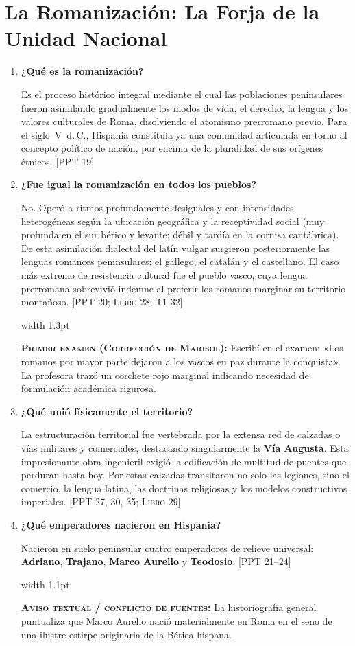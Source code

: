 \documentclass[11pt,letterpaper]{article}
\newcommand{\fuente}[1]{\nolinebreak\hfill{\footnotesize\color{black!55}\textsc{[#1]}}}
\newcommand{\examen}[1]{%
  \par\vspace{0.35em}%
  \noindent\hspace*{0.8em}%
  {\color{goodingCrimson}\vrule width 1.3pt}\hspace{0.7em}%
  \parbox{\dimexpr\linewidth-2.2em}{%
    \footnotesize\color{goodingCrimson}%
    \textbf{\textsc{Primer examen (Corrección de Marisol):}} #1%
  }%
  \par\vspace{0.35em}%
}
\newcommand{\aviso}[1]{%
  \par\vspace{0.3em}%
  \noindent\hspace*{0.8em}%
  {\color{black!40}\vrule width 1.1pt}\hspace{0.7em}%
  \parbox{\dimexpr\linewidth-2.2em}{%
    \footnotesize\color{black!75}%
    \textbf{\textsc{Aviso textual / conflicto de fuentes:}} #1%
  }%
  \par\vspace{0.3em}%
}
\newcommand{\preg}[1]{\item \textbf{#1}\par\nopagebreak\vspace{0.2em}}
\begin{document}
\section{La Romanización: La Forja de la Unidad Nacional}

\begin{enumerate}[resume]
  \preg{¿Qué es la romanización?}
  Es el proceso histórico integral mediante el cual las poblaciones peninsulares fueron asimilando gradualmente los modos de vida, el derecho, la lengua y los valores culturales de Roma, disolviendo el atomismo prerromano previo. Para el siglo~V~d.\,C., Hispania constituía ya una comunidad articulada en torno al concepto político de nación, por encima de la pluralidad de sus orígenes étnicos. \fuente{PPT 19}

  \preg{¿Fue igual la romanización en todos los pueblos?}
  No. Operó a ritmos profundamente desiguales y con intensidades heterogéneas según la ubicación geográfica y la receptividad social (muy profunda en el sur bético y levante; débil y tardía en la cornisa cantábrica). De esta asimilación dialectal del latín vulgar surgieron posteriormente las lenguas romances peninsulares: el gallego, el catalán y el castellano. El caso más extremo de resistencia cultural fue el pueblo vasco, cuya lengua prerromana sobrevivió indemne al preferir los romanos marginar su territorio montañoso. \fuente{PPT 20; Libro 28; T1 32}
  \examen{Escribí en el examen: «Los romanos por mayor parte dejaron a los vascos en paz durante la conquista». La profesora trazó un corchete rojo marginal indicando necesidad de formulación académica rigurosa.}

  \preg{¿Qué unió físicamente el territorio?}
  La estructuración territorial fue vertebrada por la extensa red de calzadas o vías militares y comerciales, destacando singularmente la \textbf{Vía Augusta}. Esta impresionante obra ingenieril exigió la edificación de multitud de puentes que perduran hasta hoy. Por estas calzadas transitaron no solo las legiones, sino el comercio, la lengua latina, las doctrinas religiosas y los modelos constructivos imperiales. \fuente{PPT 27, 30, 35; Libro 29}

  \preg{¿Qué emperadores nacieron en Hispania?}
  Nacieron en suelo peninsular cuatro emperadores de relieve universal: \textbf{Adriano}, \textbf{Trajano}, \textbf{Marco Aurelio} y \textbf{Teodosio}. \fuente{PPT 21--24}
  \aviso{La historiografía general puntualiza que Marco Aurelio nació materialmente en Roma en el seno de una ilustre estirpe originaria de la Bética hispana.}
\end{enumerate}
\end{document}
